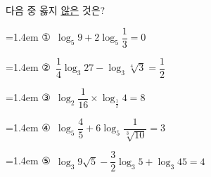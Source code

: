 다음 중 옳지 \underline{않은} 것은?
\par\medskip\par\noindent\hangindent=1.4em {\small ①}\ $\log_5 9+2\log_5 \dfrac{1}{3}=0$\par\noindent\hangindent=1.4em {\small ②}\ $\dfrac{1}{4}\log_3 27-\log_3 \sqrt[4]{3}=\dfrac{1}{2}$\par\noindent\hangindent=1.4em {\small ③}\ $\log_2 \dfrac{1}{16}\times\log_{\frac{1}{2}} 4=8$\par\noindent\hangindent=1.4em {\small ④}\ $\log_5 \dfrac{4}{5}+6\log_5 \dfrac{1}{\sqrt[3]{10}}=3$\par\noindent\hangindent=1.4em {\small ⑤}\ $\log_3 9\sqrt{5}-\dfrac{3}{2}\log_3 5+\log_3 45=4$\par\medskip
